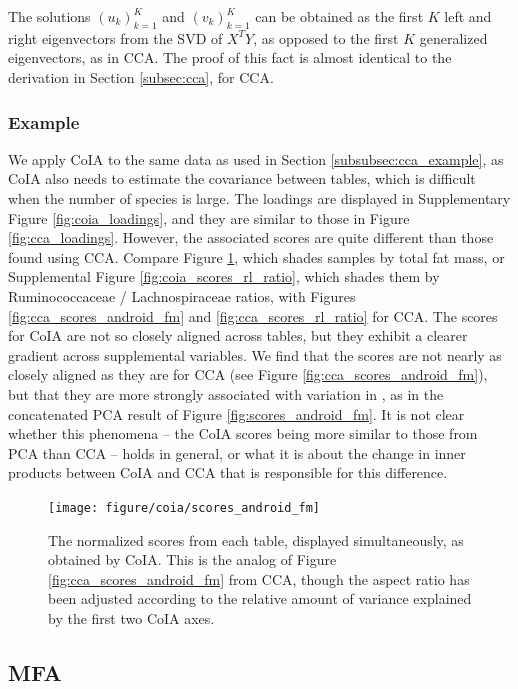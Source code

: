 \documentclass[14pt]{extarticle}
\begin{document}
The solutions $\left(u_{k}\right)_{k = 1}^{K}$ and $\left(v_{k}\right)_{k =
  1}^{K}$ can be obtained as the first $K$ left and right eigenvectors from the
SVD of $X^{T}Y$, as opposed to the first $K$ generalized eigenvectors, as in
CCA. The proof of this fact is almost identical to the derivation in Section
\ref{subsec:cca}, for CCA.

\subsubsection{Example}
\label{subsubsec:coia_example}

We apply CoIA to the same data as used in Section \ref{subsubsec:cca_example},
as CoIA also needs to estimate the covariance between tables, which is difficult
when the number of species is large. The loadings are displayed in Supplementary
Figure \ref{fig:coia_loadings}, and they are similar to those in Figure
\ref{fig:cca_loadings}. However, the associated scores are quite different than
those found using CCA. Compare Figure \ref{fig:coia_scores_android_fm}, which
shades samples by total fat mass, or Supplemental Figure
\ref{fig:coia_scores_rl_ratio}, which shades them by Ruminococcaceae /
Lachnospiraceae ratios, with Figures \ref{fig:cca_scores_android_fm} and
\ref{fig:cca_scores_rl_ratio} for CCA. The scores for CoIA are not so closely
aligned across tables, but they exhibit a clearer gradient across supplemental
variables. We find that the scores are not nearly as closely aligned as they are
for CCA (see Figure \ref{fig:cca_scores_android_fm}), but that they are more
strongly associated with variation in , as in the concatenated PCA result of
Figure \ref{fig:scores_android_fm}. It is not clear whether this phenomena -- the
CoIA scores being more similar to those from PCA than CCA -- holds in general,
or what it is about the change in inner products between CoIA and CCA that is
responsible for this difference.

\begin{figure}
  \centering
  \texttt{[image: figure/coia/scores\_android\_fm]}
  \caption{The normalized scores from each table, displayed
    simultaneously, as obtained by CoIA. This is the analog of Figure
    \ref{fig:cca_scores_android_fm} from CCA, though the aspect ratio has been
    adjusted according to the relative amount of variance explained by the first
    two CoIA axes.
    \label{fig:coia_scores_android_fm} }
\end{figure}

\subsection{MFA}
\label{subsec:mfa}
\end{document}
